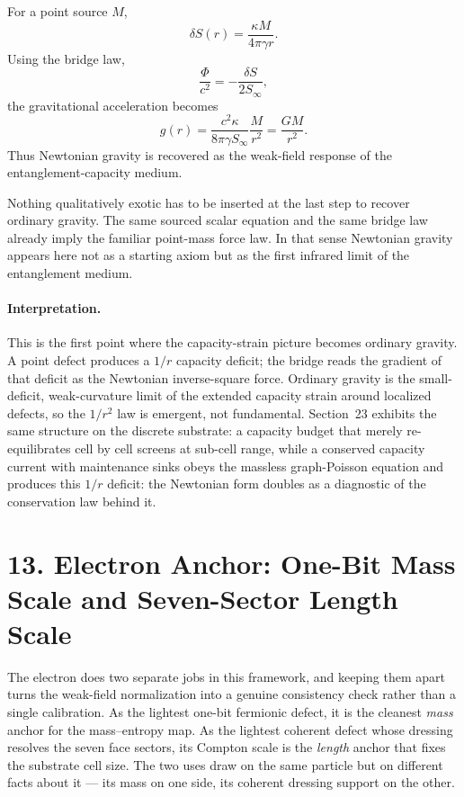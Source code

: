 \documentclass[11pt]{article}
\begin{document}
For a point source $M$,
\[
\delta S(r)=\frac{\kappa M}{4\pi\gamma r}.
\]
Using the bridge law,
\[
\frac{\Phi}{c^2}=-\frac{\delta S}{2S_\infty},
\]
the gravitational acceleration becomes
\[
g(r)=\frac{c^2\kappa}{8\pi\gamma S_\infty}\frac{M}{r^2}
=
\frac{GM}{r^2}.
\]
Thus Newtonian gravity is recovered as the weak-field response of the entanglement-capacity medium.

Nothing qualitatively exotic has to be inserted at the last step to recover ordinary gravity. The same sourced scalar equation and the same bridge law already imply the familiar point-mass force law. In that sense Newtonian gravity appears here not as a starting axiom but as the first infrared limit of the entanglement medium.

\paragraph{Interpretation.}
This is the first point where the capacity-strain picture becomes ordinary gravity. A point defect produces a $1/r$ capacity deficit; the bridge reads the gradient of that deficit as the Newtonian inverse-square force. Ordinary gravity is the small-deficit, weak-curvature limit of the extended capacity strain around localized defects, so the $1/r^2$ law is emergent, not fundamental. Section~23 exhibits the same structure on the discrete substrate: a capacity budget that merely re-equilibrates cell by cell screens at sub-cell range, while a conserved capacity current with maintenance sinks obeys the massless graph-Poisson equation and produces this $1/r$ deficit: the Newtonian form doubles as a diagnostic of the conservation law behind it.

\section{13. Electron Anchor: One-Bit Mass Scale and Seven-Sector Length Scale}

The electron does two separate jobs in this framework, and keeping them apart turns the weak-field normalization into a genuine consistency check rather than a single calibration. As the lightest one-bit fermionic defect, it is the cleanest \emph{mass} anchor for the mass--entropy map. As the lightest coherent defect whose dressing resolves the seven face sectors, its Compton scale is the \emph{length} anchor that fixes the substrate cell size. The two uses draw on the same particle but on different facts about it --- its mass on one side, its coherent dressing support on the other.
\end{document}

